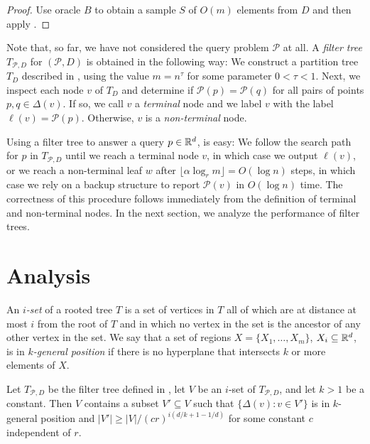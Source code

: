 \documentclass{patmorin}
\begin{document}
\begin{proof}
Use oracle $B$ to obtain a sample $S$ of $O(m)$ elements from $D$ and
then apply .
\end{proof}

Note that, so far, we have not considered the query problem $\mathcal{P}$
at all. A \emph{filter tree} $T_{\mathcal{P},D}$ for $(\mathcal{P},D)$
is obtained in the following way:  We construct a partition tree $T_D$
described in , using the value $m=n^{\tau}$
for some parameter $0 < \tau < 1$.  Next, we inspect each node $v$ of
$T_D$ and determine if $\mathcal{P}(p)=\mathcal{P}(q)$ for all pairs of
points $p,q\in \Delta(v)$. If so, we call $v$ a \emph{terminal} node and
we label $v$ with the label $\ell(v) = \mathcal{P}(p)$.  Otherwise, $v$
is a \emph{non-terminal} node.

Using a filter tree to answer a query $p\in \mathbb{R}^d$, is easy: We follow
the search path for $p$ in $T_{\mathcal{P},D}$ until we reach a terminal
node $v$, in which case we output $\ell(v)$, or we reach a non-terminal
leaf $w$ after $\lfloor \alpha\log_r m\rfloor=O(\log n)$ steps, in which
case we rely on a backup structure to report $\mathcal{P}(v)$ in $O(\log
n)$ time.  The correctness of this procedure follows immediately from
the definition of terminal and non-terminal nodes.  In the next section,
we analyze the performance of filter trees.



\section{Analysis}

An \emph{$i$-set} of a rooted tree $T$ is a set of vertices in $T$ all
of which are at distance at most $i$ from the root of $T$ and in which no
vertex in the set is the ancestor of any other vertex in the set.  We say
that a set of regions $X=\{X_1,\ldots,X_m\}$, $X_i\subseteq\mathbb{R}^d$, is in
\emph{$k$-general position} if there is no hyperplane that intersects $k$
or more elements of $X$.

\begin{lem}
  Let $T_{\mathcal{P},D}$ be the filter tree defined in
  , let $V$ be an $i$-set of $T_{\mathcal{P},D}$,
  and let $k>1$ be a constant.  Then $V$ contains a subset $V'\subseteq V$
  such that $\{\Delta(v): v\in V'\}$ is in $k$-general position and
  $|V'|\ge |V|/(cr)^{i(d/k+1-1/d)}$ for some constant $c$ independent of $r$.
\end{lem}
\end{document}
